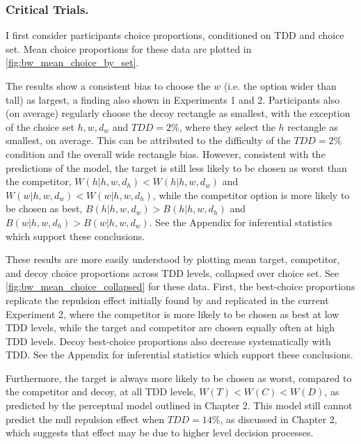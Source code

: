 \subsubsection{Critical Trials.}
I first consider participants choice proportions, conditioned on TDD and choice set. Mean choice proportions for these data are plotted in \ref{fig:bw_mean_choice_by_set}. 

The results show a consistent bias to choose the $w$ (i.e. the option wider than tall) as largest, a finding also shown in Experiments 1 and 2. Participants also (on average) regularly choose the decoy rectangle as smallest, with the exception of the choice set $h,w,d_{w}$ and $TDD=2\%$, where they select the $h$ rectangle as smallest, on average. This can be attributed to the difficulty of the $TDD=2\%$ condition and the overall wide rectangle bias. However, consistent with the predictions of the model, the target is still less likely to be chosen as worst than the competitor, $W(h|{h,w,d_{h}})<W(h|{h,w,d_{w}})$ and $W(w|{h,w,d_{w}})<W(w|{h,w,d_{h}})$, while the competitor option is more likely to be chosen as best, $B(h|{h,w,d_{w}})>B(h|{h,w,d_{h}})$ and $B(w|{h,w,d_{h}})>B(w|{h,w,d_{w}})$. See the Appendix for inferential statistics which support these conclusions.

These results are more easily understood by plotting mean target, competitor, and decoy choice proportions across TDD levels, collapsed over choice set. See \ref{fig:bw_mean_choice_collapsed} for these data. First, the best-choice proportions replicate the repulsion effect initially found by \textcite{spektorWhenGoodLooks2018b} and replicated in the current Experiment 2, where the competitor is more likely to be chosen as best at low TDD levels, while the target and competitor are chosen equally often at high TDD levels. Decoy best-choice proportions also decrease systematically with TDD. See the Appendix for inferential statistics which support these conclusions. 

Furthermore, the target is always more likely to be chosen as worst, compared to the competitor and decoy, at all TDD levels, $W(T)<W(C)<W(D)$, as predicted by the perceptual model outlined in Chapter 2. This model still cannot predict the null repulsion effect when $TDD=14\%$, as discussed in Chapter 2, which suggests that effect may be due to higher level decision processes.

